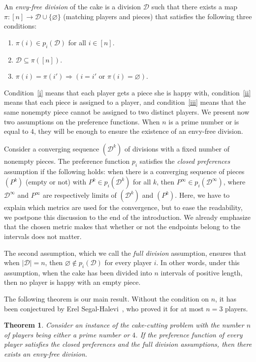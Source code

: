\documentclass[12pt]{amsart}
\newtheorem{theorem}{Theorem} %
\theoremstyle{definition}
\theoremstyle{remark}
\def\D{\mathcal{D}}
\begin{document}
An {\em envy-free division} of the cake is a division $\D$ such that there exists a map $\pi\colon[n]\rightarrow\D\cup\{\varnothing\}$ (matching players and pieces) that satisfies the following three conditions: 
\begin{enumerate}[label=(\roman*)]
\item\label{i} $\pi(i)\in p_i(\D)$ for all $i\in[n]$.
\item\label{ii} $\D\subseteq\pi([n])$.
\item\label{iii} $\pi(i)=\pi(i')\Longrightarrow (i=i' \mbox{ or } \pi(i)=\varnothing)$.
\end{enumerate}
Condition~\ref{i} means that each player gets a piece she is happy with, condition~\ref{ii} means that each piece is assigned to a player, and condition~\ref{iii} means that the same nonempty piece cannot be assigned to two distinct players. We present now two assumptions on the preference functions. When $n$ is a prime number or is equal to $4$, they will be enough to ensure the existence of an envy-free division. 

Consider a converging sequence $(\D^k)$ of divisions with a fixed number of nonempty pieces. The preference function $p_i$ satisfies the {\em closed preferences} assumption if the following holds: when there is a converging sequence of pieces $(P^k)$ (empty or not) with $P^k\in  p_i(\D^k)$ for all $k$, then $P^{\infty}\in p_i(\D^{\infty})$, where $\D^{\infty}$ and $P^{\infty}$ are respectively limits of $(\D^k)$ and $(P^k)$.  Here, we have to explain which metrics are used for the convergence, but to ease the readability, we postpone this discussion to the end of the introduction. We already emphasize that the chosen metric makes that whether or not the endpoints belong to the intervals does not matter.

The second assumption, which we call the {\em full division} assumption, ensures that when $|\D|=n$, then $\varnothing\notin p_i(\D)$ for every player $i$. In other words, under this assumption, when the cake has been divided into $n$ intervals of positive length, then no player is happy with an empty piece.

The following theorem is our main result. Without the condition on $n$, it has been conjectured by Erel Segal-Halevi~\cite{segal2017fairly}, who proved it for at most $n=3$ players.

\begin{theorem}\label{main}
Consider an instance of the cake-cutting problem with the number $n$ of players being either a prime number or $4$. If the preference function of every player satisfies the closed preferences and the full division assumptions, then there exists an envy-free division.
\end{theorem}
\end{document}
